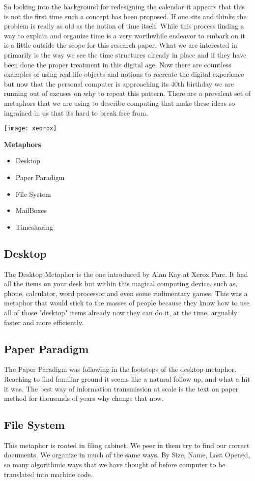 So looking into the background for redesigning the calendar it appears that this is not the first time such a concept has been proposed. If one sits and thinks the problem is really as old as the notion of time itself.
While this process finding a way to explain and organize time is a very worthwhile endeavor to embark on it is a little outside the scope for this research paper.
What we are interested in primarily is the way we see the time structures already in place and if they have been done the proper treatment in this digital age.
Now there are countless examples of using real life objects and notions to recreate the digital experience but now that the personal computer is approaching its 40th birthday we are running out of excuses on why to repeat this pattern.
There are a prevalent set of metaphors that we are using to describe computing that make these ideas so ingrained in us that its hard to break free from.

\texttt{[image: xeorox]}

\bf{Metaphors}
\begin{itemize}
    \item Desktop
    \item Paper Paradigm
    \item File System
    \item MailBoxes
    \item Timesharing
\end{itemize}
\subsection{Desktop}
The Desktop Metaphor is the one introduced by Alan Kay at Xerox Parc. It had all the items on your desk but within this magical computing device, such as, phone, calculator, word processor and even some rudimentary games.
 This was a metaphor that would stick to the masses of people because they know how to use all of those "desktop" items already now they can do it, at the time, arguably faster and more efficiently.
\subsection{Paper Paradigm}
The Paper Paradigm was following in the footsteps of the desktop metaphor.
Reaching to find familiar ground it seems like a natural follow up, and what a hit it was.  The best way of information transmission at scale is the text on paper method for thousands of years why change that now.
\subsection{File System}
This metaphor is rooted in filing cabinet.
We peer in them try to find our correct documents. We organize in much of the same ways. By Size, Name, Last Opened, so many algorithmic ways that we have thought of before computer to be translated into machine code.
